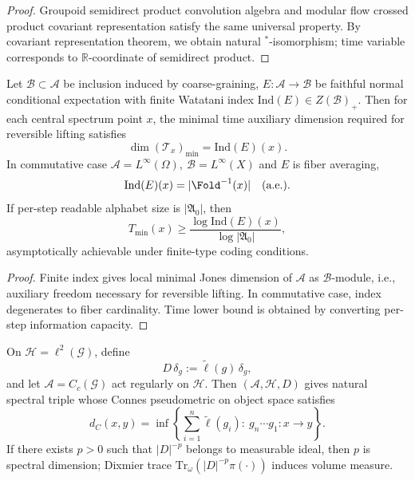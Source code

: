 \begin{proof}
Groupoid semidirect product convolution algebra and modular flow crossed product covariant representation satisfy the same universal property.
By covariant representation theorem, we obtain natural \(^\ast\)-isomorphism; time variable corresponds to \(\mathbb R\)-coordinate of semidirect product.
\end{proof}

\begin{theorem}\label{thm:xi-local-index-equals-local-time-fiber}
Let \(\mathcal B\subset\mathcal A\) be inclusion induced by coarse-graining, \(E:\mathcal A\to\mathcal B\) be faithful normal conditional expectation with finite Watatani index \(\mathrm{Ind}(E)\in Z(\mathcal B)_+\).
Then for each central spectrum point \(x\), the minimal time auxiliary dimension required for reversible lifting satisfies
\[
\dim(\mathcal T_x)_{\min}=\mathrm{Ind}(E)(x).
\]
In commutative case
\(
\mathcal A=L^\infty(\Omega),\ \mathcal B=L^\infty(X)
\)
and \(E\) is fiber averaging,
\[
\mathrm{Ind}(E)(x)=|\Fold^{-1}(x)|\quad\text{(a.e.)}.
\]
If per-step readable alphabet size is \(|\mathfrak A_0|\), then
\[
T_{\min}(x)\ge \frac{\log \mathrm{Ind}(E)(x)}{\log |\mathfrak A_0|},
\]
asymptotically achievable under finite-type coding conditions.
\end{theorem}

\begin{proof}
Finite index gives local minimal Jones dimension of \(\mathcal A\) as \(\mathcal B\)-module, i.e., auxiliary freedom necessary for reversible lifting.
In commutative case, index degenerates to fiber cardinality.
Time lower bound is obtained by converting per-step information capacity.
\end{proof}

\begin{theorem}\label{thm:xi-time-spectral-triple-distance-volume}
On \(\mathcal H=\ell^2(\mathcal G)\), define
\[
D\,\delta_g:=\widetilde\ell(g)\,\delta_g,
\]
and let \(\mathcal A=C_c(\mathcal G)\) act regularly on \(\mathcal H\).
Then \((\mathcal A,\mathcal H,D)\) gives natural spectral triple whose Connes pseudometric on object space satisfies
\[
d_C(x,y)
=
\inf\left\{
\sum_{i=1}^n\widetilde\ell(g_i):\ g_n\cdots g_1:x\to y
\right\}.
\]
If there exists \(p>0\) such that \(|D|^{-p}\) belongs to measurable ideal, then \(p\) is spectral dimension; Dixmier trace
\(
\mathrm{Tr}_\omega(|D|^{-p}\pi(\cdot))
\)
induces volume measure.
\end{theorem}

